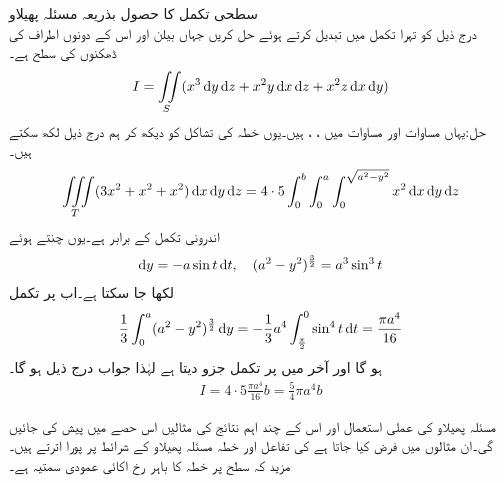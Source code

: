 \quad سطحی تکمل کا حصول بذریعہ مسئلہ پھیلاو\\
درج ذیل کو تہرا  تکمل میں تبدیل کرتے ہوئے حل کریں جہاں  بیلن  اور اس کے دونوں اطراف کی ڈھکنوں کی سطح ہے۔
\begin{align*}
I=\iint\limits_S (x^3\dif y\dif z+x^2y\dif x\dif z+x^2z\dif x\dif y)
\end{align*}
حل:یہاں مساوات  اور مساوات  میں ، ،  ہیں۔یوں خطہ  کی تشاکل کو دیکھ کر ہم درج ذیل لکھ سکتے ہیں۔
\begin{align*}
\iiint\limits_T (3x^2+x^2+x^2)\dif x\dif y\dif z=4\cdot 5\int_0^b \int_0^a\int_0^{\sqrt{a^2-y^2}}x^2\dif x\dif y\dif z
\end{align*}
اندرونی تکمل  کے برابر ہے۔یوں  چنتے ہوئے
\begin{align*}
\dif y=-a\sin t\dif t,\quad (a^2-y^2)^{\frac{3}{2}}=a^3\sin^3 t
\end{align*}
لکھا جا سکتا ہے۔اب  پر تکمل
\begin{align*}
\frac{1}{3}\int_0^a (a^2-y^2)^{\frac{3}{2}}\dif y=-\frac{1}{3} a^4\int_{\frac{\pi}{2}}^{0}\sin^4 t \dif t=\frac{\pi a^4}{16}
\end{align*}
ہو گا اور آخر میں  پر تکمل جزو  دیتا  ہے لہٰذا جواب درج ذیل ہو گا۔
\begin{align*}
I=4\cdot 5\frac{\pi a^4}{16}b=\frac{5}{4}\pi a^4b
\end{align*}

مسئلہ پھیلاو کی عملی استعمال اور اس کے چند اہم نتائج کی مثالیں اس حصے میں پیش کی جائیں گی۔ان مثالوں میں فرض کیا جاتا ہے کی تفاعل اور خطہ  مسئلہ پھیلاو کے شرائط  پر پورا اترتے ہیں۔ مزید کہ سطح  پر خطہ  کا باہر رخ اکائی عمودی سمتیہ   ہے۔

